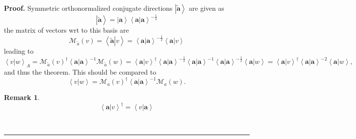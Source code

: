 \documentclass[aps,preprint]{revtex4}%
\newtheorem{remark}[theorem]{Remark}
\newenvironment{proof}[1][Proof]{\noindent\textbf{#1.} }{\ \rule{0.5em}{0.5em}}
\begin{document}
\begin{proof}
Symmetric orthonormalized conjugate directions $\left\vert
\widetilde{\mathbf{a}}\right\rangle $ are given as
\begin{equation}
\left\vert \widetilde{\mathbf{a}}\right\rangle =\left\vert \mathbf{a}%
\right\rangle \left\langle \left.  \mathbf{a}\right\vert \mathbf{a}%
\right\rangle ^{-\frac{1}{2}}%
\end{equation}
the matrix of vectors wrt to this basis are
\begin{equation}
\mathcal{M}_{\widetilde{a}}\left(  v\right)  =\left\langle \left.
\widetilde{\mathbf{a}}\right\vert v\right\rangle =\left\langle \left.
\mathbf{a}\right\vert \mathbf{a}\right\rangle ^{-\frac{1}{2}}\left\langle
\left.  \mathbf{a}\right\vert v\right\rangle
\end{equation}
leading to
\begin{equation}
\left\langle \left.  v\right\vert w\right\rangle _{A}=\mathcal{M}%
_{\widetilde{a}}\left(  v\right)  ^{\dagger}\left\langle \left.
\mathbf{a}\right\vert \mathbf{a}\right\rangle ^{-1}\mathcal{M}_{\widetilde{a}%
}\left(  w\right)  =\left\langle \left.  \mathbf{a}\right\vert v\right\rangle
^{\dagger}\left\langle \left.  \mathbf{a}\right\vert \mathbf{a}\right\rangle
^{-\frac{1}{2}}\left\langle \left.  \mathbf{a}\right\vert \mathbf{a}%
\right\rangle ^{-1}\left\langle \left.  \mathbf{a}\right\vert \mathbf{a}%
\right\rangle ^{-\frac{1}{2}}\left\langle \left.  \mathbf{a}\right\vert
w\right\rangle =\left\langle \left.  \mathbf{a}\right\vert v\right\rangle
^{\dagger}\left\langle \left.  \mathbf{a}\right\vert \mathbf{a}\right\rangle
^{-2}\left\langle \left.  \mathbf{a}\right\vert w\right\rangle ,
\end{equation}
and thus the theorem. This should be compared to
\begin{equation}
\left\langle \left.  v\right\vert w\right\rangle =\mathcal{M}_{a}\left(
v\right)  ^{\dagger}\left\langle \left.  \mathbf{a}\right\vert \mathbf{a}%
\right\rangle ^{-1}\mathcal{M}_{a}\left(  w\right)  .
\end{equation}


\begin{remark}%
\begin{equation}
\left\langle \left.  \mathbf{a}\right\vert v\right\rangle ^{\dagger
}=\left\langle \left.  v\right\vert \mathbf{a}\right\rangle
\end{equation}

\end{remark}
\end{proof}
\end{document}
